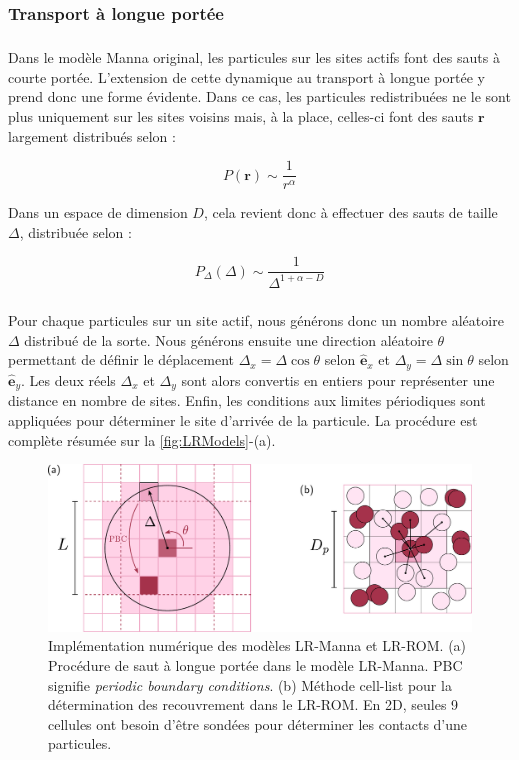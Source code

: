 \subsubsection{Transport à longue portée}

\subparagraph{}Dans le modèle Manna original, les particules sur les sites actifs font des sauts à courte portée. L’extension de cette dynamique au transport à longue portée y prend donc une forme évidente. Dans ce cas, les particules redistribuées ne le sont plus uniquement sur les sites voisins mais, à la place, celles-ci font des sauts $\mathbf{r}$ largement distribués selon :

\begin{equation}
	P(\mathbf{r}) \sim \frac{1}{r^\alpha}
\end{equation}

\noindent Dans un espace de dimension $D$, cela revient donc à effectuer des sauts de taille $\Delta$, distribuée selon :

\begin{equation}
	P_\Delta(\Delta) \sim \frac{1}{\Delta^{1+\alpha-D}}
	\label{eq:sauts}
\end{equation}

\subparagraph{}Pour chaque particules sur un site actif, nous générons donc un nombre aléatoire $\Delta$ distribué de la sorte. Nous générons ensuite une direction aléatoire $\theta$ permettant de définir le déplacement $\Delta_x = \Delta \cos \theta$ selon $\hat{\mathbf{e}}_x$ et $\Delta_y = \Delta \sin \theta$ selon $\hat{\mathbf{e}}_y$. Les deux réels $\Delta_x$ et $\Delta_y$ sont alors convertis en entiers pour représenter une distance en nombre de sites. Enfin, les conditions aux limites périodiques sont appliquées pour déterminer le site d'arrivée de la particule. La procédure est complète résumée sur la \autoref{fig:LRModels}-(a).

\begin{figure}[h]
	\centering
	\includegraphics[width=\textwidth]{Chapitre2/Figures/Modeles/MannaJumps.pdf}
	\caption{Implémentation numérique des modèles LR-Manna et LR-ROM. (a) Procédure de saut à longue portée dans le modèle LR-Manna. PBC signifie \textit{periodic boundary conditions}. (b) Méthode cell-list pour la détermination des recouvrement dans le LR-ROM. En 2D, seules 9 cellules ont besoin d'être sondées pour déterminer les contacts d'une particules.}
	\label{fig:LRModels}
\end{figure}


